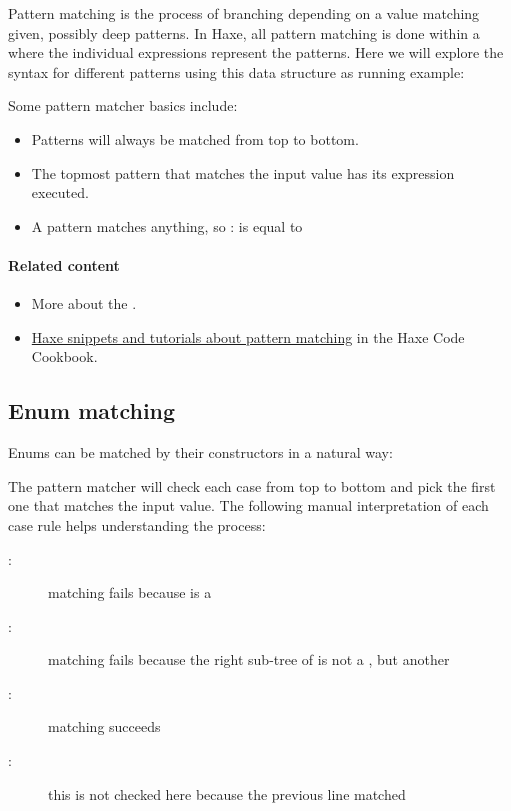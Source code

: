 Pattern matching is the process of branching depending on a value matching given, possibly deep patterns. In Haxe, all pattern matching is done within a  where the individual  expressions represent the patterns. Here we will explore the syntax for different patterns using this data structure as running example:


Some pattern matcher basics include:

\begin{itemize}
	\item Patterns will always be matched from top to bottom.
	\item The topmost pattern that matches the input value has its expression executed.
	\item A \expr{_} pattern matches anything, so : is equal to 
\end{itemize}

\paragraph{Related content}
\begin{itemize}
	\item More about the .
	\item \href{http://code.haxe.org/tag/pattern-matching.html}{Haxe snippets and tutorials about pattern matching} in the Haxe Code Cookbook.
\end{itemize}

\subsection{Enum matching}
\label{lf-pattern-matching-enums}

Enums can be matched by their constructors in a natural way:


The pattern matcher will check each case from top to bottom and pick the first one that matches the input value. The following manual interpretation of each case rule helps understanding the process:

\begin{description}
	\item[:] matching fails because  is a 
	\item[:] matching fails because the right sub-tree of  is not a , but another 
	\item[:] matching succeeds
	\item[:] this is not checked here because the previous line matched
\end{description}

